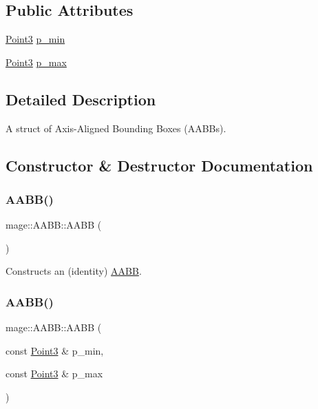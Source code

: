 \subsection*{Public Attributes}
\begin{DoxyCompactItemize}
\item 
\hyperlink{structmage_1_1_point3}{Point3} \hyperlink{structmage_1_1_a_a_b_b_a600c62081fd3516c0be64bb81495cd1d}{p\+\_\+min}
\item 
\hyperlink{structmage_1_1_point3}{Point3} \hyperlink{structmage_1_1_a_a_b_b_ad0a69206176c61ce9a71f2ddb0e5deb2}{p\+\_\+max}
\end{DoxyCompactItemize}


\subsection{Detailed Description}
A struct of Axis-\/\+Aligned Bounding Boxes (A\+A\+B\+Bs). 

\subsection{Constructor \& Destructor Documentation}
\hypertarget{structmage_1_1_a_a_b_b_ae6db94dcb9165eb008f0be8741f0eb62}{}\label{structmage_1_1_a_a_b_b_ae6db94dcb9165eb008f0be8741f0eb62} 
\subsubsection{\texorpdfstring{A\+A\+B\+B()}{AABB()}\hspace{0.1cm}{\footnotesize\ttfamily [1/2]}}
{\footnotesize\ttfamily mage\+::\+A\+A\+B\+B\+::\+A\+A\+BB (\begin{DoxyParamCaption}{ }\end{DoxyParamCaption})}

Constructs an (identity) \hyperlink{structmage_1_1_a_a_b_b}{A\+A\+BB}. \hypertarget{structmage_1_1_a_a_b_b_aff9e36907c435c74cc948a13cc9f1222}{}\label{structmage_1_1_a_a_b_b_aff9e36907c435c74cc948a13cc9f1222} 
\subsubsection{\texorpdfstring{A\+A\+B\+B()}{AABB()}\hspace{0.1cm}{\footnotesize\ttfamily [2/2]}}
{\footnotesize\ttfamily mage\+::\+A\+A\+B\+B\+::\+A\+A\+BB (\begin{DoxyParamCaption}\item[{const \hyperlink{structmage_1_1_point3}{Point3} \&}]{p\+\_\+min,  }\item[{const \hyperlink{structmage_1_1_point3}{Point3} \&}]{p\+\_\+max }\end{DoxyParamCaption})}

